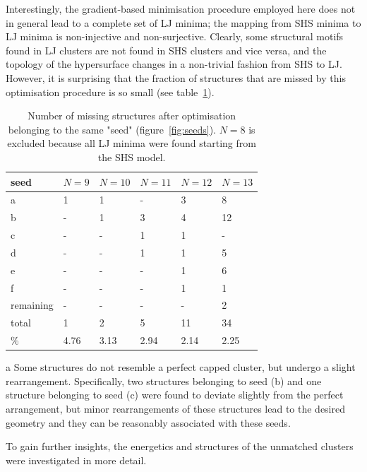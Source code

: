 Interestingly, the gradient-based minimisation procedure employed here does not
in general lead to a complete set of \ac{LJ} minima; the mapping from \ac{SHS}
minima to \ac{LJ} minima is non-injective and non-surjective. Clearly, some
structural motifs found in \ac{LJ} clusters are not found in \ac{SHS} clusters
and vice versa, and the topology of the hypersurface changes in a non-trivial
fashion from \ac{SHS} to \ac{LJ}. However, it is surprising that the fraction of
structures that are missed by this optimisation procedure is so small (see
table~\ref{tab:seeds}). 
%
\begin{table}[htb]\centering
    \begin{threeparttable}
    \caption{Number of missing structures after optimisation belonging to the
    same "seed" (figure~\ref{fig:seeds}). $N=8$ is excluded because all LJ minima were
    found starting from the \acs{SHS} model.}
    \label{tab:seeds}
    \begin{tabular}{llllll}\toprule
        seed      & $N=9$   & $N=10$  & $N=11$  & $N=12$  & $N=13$  \\ \midrule
        a         & 1    & 1    & -    & 3    & 8    \\
        b         & -    & 1    & 3    & 4    & 12\tnote{a}   \\
        c         & -    & -    & 1    & 1\tnote{a}    & -    \\
        d         & -    & -    & 1    & 1    & 5    \\
        e         & -    & -    & -    & 1    & 6    \\
        f         & -    & -    & -    & 1    & 1    \\
        remaining & -    & -    & -    & -    & 2    \\ 
        total     & 1    & 2    & 5    & 11   & 34   \\
        \%        & 4.76 & 3.13 & 2.94 & 2.14 & 2.25 \\ \bottomrule
    \end{tabular}
        \begin{tablenotes}
        \item[a]{Some structures do not resemble a perfect capped
        cluster, but undergo a slight rearrangement. Specifically, two structures belonging to seed (b) and one structure belonging to seed (c) were found to deviate slightly from the perfect arrangement, but minor rearrangements of these structures lead to the desired geometry and they can be reasonably associated with these seeds.}
        \end{tablenotes}
    \end{threeparttable}
\end{table}%
%
To gain further insights, the energetics and structures of the unmatched
clusters were investigated in more detail.

